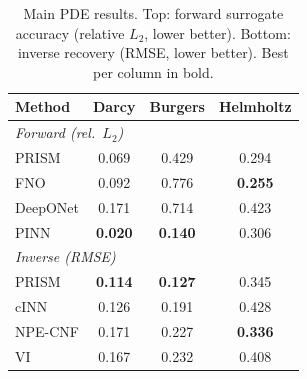 \begin{table}[t]
\centering
\caption{Main PDE results. Top: forward surrogate accuracy (relative $L_2$, lower better). Bottom: inverse recovery (RMSE, lower better). Best per column in bold.}
\label{tab:main-pde}
\begin{tabular}{lccc}
\toprule
Method & Darcy & Burgers & Helmholtz \\
\midrule
\multicolumn{4}{l}{\emph{Forward (rel.\ $L_2$)}} \\
PRISM & 0.069 & 0.429 & 0.294 \\
FNO & 0.092 & 0.776 & \textbf{0.255} \\
DeepONet & 0.171 & 0.714 & 0.423 \\
PINN & \textbf{0.020} & \textbf{0.140} & 0.306 \\
\midrule
\multicolumn{4}{l}{\emph{Inverse (RMSE)}} \\
PRISM & \textbf{0.114} & \textbf{0.127} & 0.345 \\
cINN & 0.126 & 0.191 & 0.428 \\
NPE-CNF & 0.171 & 0.227 & \textbf{0.336} \\
VI & 0.167 & 0.232 & 0.408 \\
\bottomrule
\end{tabular}
\end{table}
